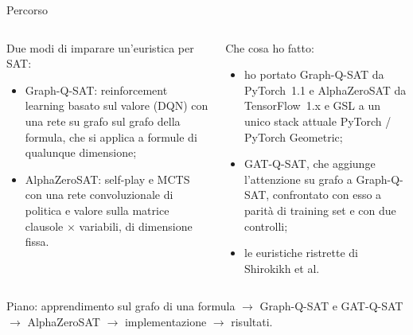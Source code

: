 \documentclass[aspectratio=169]{beamer}
\newcommand{\T}[2]{#2}
\newcommand{\T}[2]{#1}
\begin{document}
\begin{frame}{\T{Roadmap}{Percorso}}
  \begin{columns}[t]
    \begin{column}{0.5\textwidth}
      \T{Two ways to learn a SAT heuristic:}{Due modi di imparare un'euristica per SAT:}
      \begin{itemize}
        \item \T{Graph-Q-SAT: value-based reinforcement learning (DQN) with a graph network
              on the graph of the formula, which applies to formulas of any size;}%
              {Graph-Q-SAT: reinforcement learning basato sul valore (DQN) con una rete su
              grafo sul grafo della formula, che si applica a formule di qualunque dimensione;}
        \item \T{AlphaZeroSAT: self-play and MCTS with a convolutional policy and value
              network on the clause $\times$ variable matrix, of fixed size.}%
              {AlphaZeroSAT: self-play e MCTS con una rete convoluzionale di politica e valore
              sulla matrice clausole $\times$ variabili, di dimensione fissa.}
      \end{itemize}
    \end{column}
    \begin{column}{0.5\textwidth}
      \T{What I did:}{Che cosa ho fatto:}
      \begin{itemize}
        \item \T{ported Graph-Q-SAT from PyTorch~1.1 and AlphaZeroSAT from TensorFlow~1.x
              and GSL to one current PyTorch / PyTorch Geometric stack;}%
              {ho portato Graph-Q-SAT da PyTorch~1.1 e AlphaZeroSAT da TensorFlow~1.x e GSL a
              un unico stack attuale PyTorch / PyTorch Geometric;}
        \item \T{GAT-Q-SAT, which adds graph attention to Graph-Q-SAT, compared with it at
              matched training set and with two controls;}%
              {GAT-Q-SAT, che aggiunge l'attenzione su grafo a Graph-Q-SAT, confrontato con
              esso a parit\`a di training set e con due controlli;}
        \item \T{the restricted heuristics of Shirokikh et al.}%
              {le euristiche ristrette di Shirokikh et al.}
      \end{itemize}
    \end{column}
  \end{columns}
  \vfill
  {\footnotesize\color{gray} \T{Plan: learning on the graph of a formula $\to$ Graph-Q-SAT and
  GAT-Q-SAT $\to$ AlphaZeroSAT $\to$ implementation $\to$ results.}{Piano: apprendimento sul
  grafo di una formula $\to$ Graph-Q-SAT e GAT-Q-SAT $\to$ AlphaZeroSAT $\to$ implementazione
  $\to$ risultati.}}
\end{frame}
\end{document}
